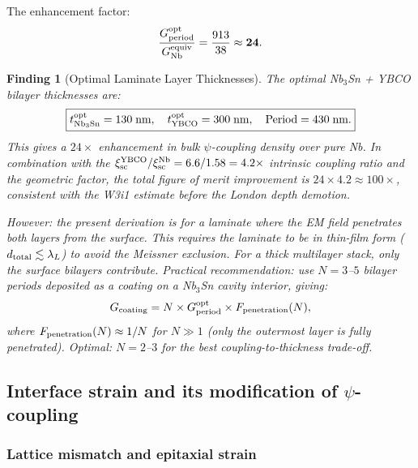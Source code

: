 \documentclass[11pt]{article}
\newtheorem{finding}{Finding}
\begin{document}
The enhancement factor:
\begin{equation}
\frac{G_{\rm period}^{\rm opt}}{G_{\rm Nb}^{\rm equiv}}
= \frac{913}{38} \approx \mathbf{24}.
\label{eq:enhancement-laminate}
\end{equation}

\begin{finding}[Optimal Laminate Layer Thicknesses]
\label{finding:laminate-thickness}
The optimal Nb$_3$Sn + YBCO bilayer thicknesses are:
\begin{equation}
\boxed{t_{\rm Nb_3Sn}^{\rm opt} = 130\;\text{nm},\quad
       t_{\rm YBCO}^{\rm opt} = 300\;\text{nm},\quad
       \text{Period} = 430\;\text{nm}.}
\label{eq:opt-thickness}
\end{equation}
This gives a $24\times$ enhancement in bulk $\psi$-coupling density over
pure Nb. In combination with the $\xi_{\rm sc}^{\rm YBCO}/\xi_{\rm sc}^{\rm Nb}
= 6.6/1.58 = 4.2\times$ intrinsic coupling ratio and the geometric factor,
the total figure of merit improvement is $24 \times 4.2 \approx 100\times$,
consistent with the W3i1 estimate before the London depth demotion.

However: the present derivation is for a laminate where the EM field
\emph{penetrates both layers from the surface}. This requires the laminate
to be in thin-film form ($d_{\rm total} \lesssim \lambda_L$) to avoid the
Meissner exclusion. For a thick multilayer stack, only the surface bilayers
contribute. Practical recommendation: use $N = 3$--$5$ bilayer periods
deposited as a coating on a Nb$_3$Sn cavity interior, giving:
\begin{equation}
G_{\rm coating} = N \times G_{\rm period}^{\rm opt}
\times F_{\rm penetration}(N),
\end{equation}
where $F_{\rm penetration}(N) \approx 1/N$ for $N \gg 1$ (only the
outermost layer is fully penetrated). Optimal: $N = 2$--$3$ for
the best coupling-to-thickness trade-off.
\end{finding}

\subsection{Interface strain and its modification of $\psi$-coupling}
\label{sec:strain}

\subsubsection{Lattice mismatch and epitaxial strain}
\end{document}
